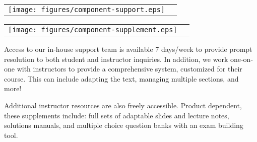 \vspace{2em}

\begin{multicols}{2}
\begin{center}
\begin{lscshdrbox}
\begin{tabu}{X[1,c,m] X[2,l,m]}
\vspace{0pt}
\texttt{[image: figures/component-support.eps]}
&
\vspace{0pt}
\textcolor{white}{\textbf{\fontsize{14}{20}\selectfont {SUPPORT}}}
\end{tabu}
\end{lscshdrbox}
\end{center}

\columnbreak

\begin{center}
\begin{lscshdrbox}
\begin{tabu}{X[1,c,m] X[2,l,m]}
\vspace{0pt}
\texttt{[image: figures/component-supplement.eps]}
&
\vspace{0pt}
\textcolor{white}{\textbf{\fontsize{14}{20}\selectfont {INSTRUCTOR SUPPLEMENTS}}}
\end{tabu}
\end{lscshdrbox}
\end{center}
\end{multicols}



\begin{center}
\begin{multicols}{2}
\parbox{0.9\linewidth}{
	Access to our in-house support team is available 7 days/week to provide prompt resolution to both student and instructor inquiries. In addition, we work one-on-one with instructors to provide a comprehensive system, customized for their course. This can include adapting the text, managing multiple sections, and more!
	}

\columnbreak
	\parbox{0.9\linewidth}{
Additional instructor resources are also freely accessible. Product dependent, these supplements include: full sets of adaptable slides and lecture notes, solutions manuals, and multiple choice question banks with an exam building tool.
	}
\end{multicols}
\end{center}

\vfill

\begin{center}
	\textcolor{lscstextcolour}{\textbf{\fontsize{18}{22}\selectfont {Contact Lyryx Today!}}} \\
\medskip
\textcolor{lyryxcolour}{\textbf{\fontsize{14}{18}\selectfont {info@lyryx.com}}} \\

\end{center}

\vfill


\setlength{\parskip}{\baselineskip}
